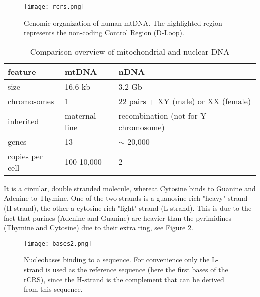\begin{figure}[ht]
\begin{center}
\texttt{[image: rcrs.png]}
\caption[Genomic organization of human mtDNA]{Genomic organization of human mtDNA. The highlighted region represents the non-coding Control Region (D-Loop). }
\label{fig:rcrs}
\end{center}
\end{figure}
\begin{table}[ht]
  \begin{tabular}{lll}
     \toprule
    feature  & mtDNA & nDNA \\ 
		\midrule
    size & 16.6 kb & 3.2 Gb  \\ 
		chromosomes & 1 & 22 pairs + XY (male) or XX (female)\\ 
    inherited & maternal line & recombination (not for Y chromosome) \\ 

		genes & 13 & $\sim$ 20,000 \\ %
		copies per cell & 100-10,000 & 2 \\ 
		\bottomrule
    \end{tabular}
    \caption[Comparison overview mtDNA and nDNA]{Comparison overview of mitochondrial and nuclear DNA }
    \label{tab:features}
\end{table}
It is a circular, double stranded molecule, whereat Cytosine binds to Guanine and Adenine to Thymine. One of the two strands is a guanosine-rich "heavy" strand (H-strand), the other a cytosine-rich "light" strand (L-strand). This is due to the fact that purines (Adenine and Guanine) are heavier than the pyrimidines (Thymine and Cytosine) due to their extra ring, see Figure \ref{fig:figureBases}.
\begin{figure}[ht]
\begin{center}
\texttt{[image: bases2.png]}
\caption[Nucleobases binding to a sequence]{Nucleobases binding to a sequence. For convenience only the L-strand is used as the reference sequence (here the first bases of the rCRS), since the H-strand is the complement that can be derived from this sequence.}
\label{fig:figureBases}
\end{center}
\end{figure}

